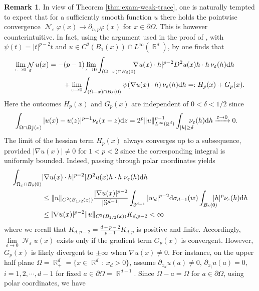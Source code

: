 \documentclass[12pt, reqno]{amsart}%
\theoremstyle{plain}  %
\theoremstyle{definition}  %
\newtheorem{remark}[theorem]{Remark}   %
\numberwithin{equation}{section}
\DeclareMathOperator{\cN}{\mathcal{N}}
\DeclareMathOperator{\R}{\mathbb{R}}
\renewcommand{\d}{\mathrm{d}}
\newcommand{\eps}{\varepsilon}
\begin{document}
\begin{remark}
In view of Theorem \ref{thm:exam-weak-trace}, one is naturally tempted to  expect that  for a sufficiently smooth function $ u $ there holds the pointwise convergence $\cN_\eps \varphi (x)\to \partial_{n,p}  \varphi (x)$ for $x\in \partial \Omega$. This is however counterintuitive. In fact, using the argument used in the proof of \cite[Theorem 9.9]{Fog25}, with $\psi(t)=|t|^{p-2}t$  and $u\in C^2(B_1(x))\cap L^\infty(\R^d)$, by one finds that
\begin{align*}
\lim_{\eps\to0} \cN_\eps u (x)
&=-(p-1)\lim_{\eps\to0} \int_{(\Omega-x)\cap B_\delta(0)}
\hspace*{-2ex}|\nabla u(x)\cdot h|^{p-2}D^2 u(x)h\cdot h  \,\nu_\eps(h)\d h\\
&\qquad+ \lim_{\eps\to0} \int_{(\Omega-x)\cap B_\delta(0)} \psi(\nabla u(x)\cdot h)\, \nu_\eps( h)\d h=: H_p(x)+G_p(x).
\end{align*}
Here  the outcomes $H_p(x)$ and $G_p(x)$  are independent of  $0<\delta<1/2$ since
\begin{align*}
\int_{\Omega\cap B^c_\delta(x)} |u(x)- u(z)|^{p-1}\nu_\eps(x-z)\d z
&= 2^{p}\|u\|^{p-1}_{L^\infty(\R^d)}\int_{|h|\geq \delta}\hspace*{-2ex} \nu_\eps(h) \d h\xrightarrow{\eps\to0}0.
\end{align*}
The limit of the hessian term $H_p(x)$ always converges up to a subsequence,  provided $|\nabla u(x)|\neq 0$ for $1<p<2$ since the corresponding integral is  uniformly bounded.  Indeed, passing through polar coordinates yields
\begin{align*}
\int_{\Omega_x\cap B_\delta(0)}
&|\nabla u(x)\cdot h|^{p-2}|D^2 u(x)h\cdot h|  \nu_\eps(h)
\d h
\\&\leq  \|u\|_{C^2(B_{1/2}(x))} \frac{ |\nabla u(x)|^{p-2}}{|\mathbb{S}^{d-1}|}\int_{\mathbb{S}^{d-1}} |w_d|^{p-2} \d \sigma_{d-1}(w) \int_{B_\delta(0)} \hspace*{-2ex} |h|^p\nu_\eps(h)\d h\\
&\leq
|\nabla u(x)|^{p-2}\|u\|_{C^2(B_{1/2}(x))}K_{d,p-2}<\infty
\end{align*}
where we recall that $K_{d,p-2}=\tfrac{d+p-2}{p-1} K_{d,p}$ is positive and finite. Accordingly, $\lim\limits_{\eps\to0} \cN_\eps u (x)$ exists only if the gradient term $G_p(x)$ is convergent. However, $G_p(x)$ is likely divergent to $\pm\infty$ when $\nabla u(x)\neq 0$.
For instance, on the upper half plane $\Omega= \R^d_{+}=\{ x\in\R^d \,:\, x_d>0\}$,  assume $\partial_{x_d} u(a) \neq 0$, $\partial_{x_i} u(a)=0$, $i=1,2,\cdots, d-1$ for fixed $a\in\partial \Omega= \R^{d-1}$. Since $\Omega-a=\Omega$ for  $a\in \partial \Omega$, using polar coordinates, we have

\end{remark}
\end{document}
